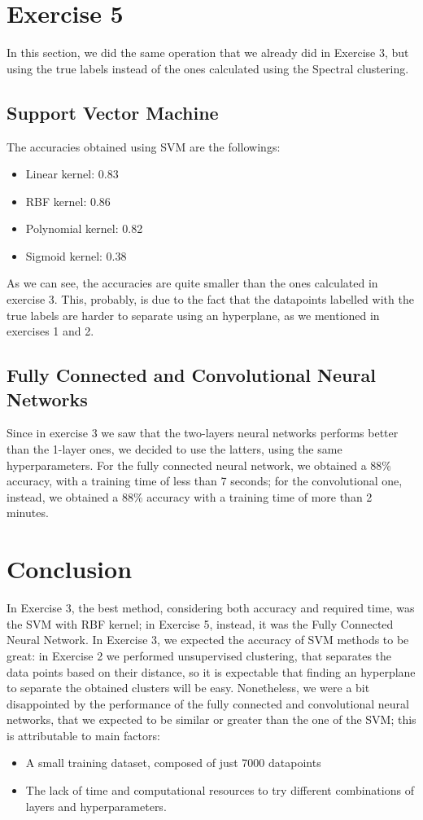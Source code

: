 \documentclass[12pt]{article}
\begin{document}
	\section*{Exercise 5}
	In this section, we did the same operation that we already did in Exercise 3, but using the true labels instead of the ones calculated using the Spectral clustering.\newline
	\subsection*{Support Vector Machine}
	The accuracies obtained using SVM are the followings:
	\begin{itemize}
		\item Linear kernel: 0.83
		\item RBF kernel: 0.86
		\item Polynomial kernel: 0.82
		\item Sigmoid kernel: 0.38
	\end{itemize}
	As we can see, the accuracies are quite smaller than the ones calculated in exercise 3. This, probably, is due to the fact that the datapoints labelled with the true labels are harder to separate using an hyperplane, as we mentioned in exercises 1 and 2.
	
	\subsection*{Fully Connected and Convolutional Neural Networks}
	Since in exercise 3 we saw that the two-layers neural networks performs better than the 1-layer ones, we decided to use the latters, using the same hyperparameters.
	For the fully connected neural network, we obtained a 88\% accuracy, with a training time of less than 7 seconds; for the convolutional one, instead, we obtained a 88\% accuracy with a training time of more than 2 minutes.
	
	
	\section*{Conclusion}
	In Exercise 3, the best method, considering both accuracy and required time, was the SVM with RBF kernel; in Exercise 5, instead, it was the Fully Connected Neural Network.\newline
	In Exercise 3, we expected the accuracy of SVM methods to be great: in Exercise 2 we performed unsupervised clustering, that separates the data points based on their distance, so it is expectable that finding an hyperplane to separate the obtained clusters will be easy.\newline
	Nonetheless, we were a bit disappointed by the performance of the fully connected and convolutional neural networks, that we expected to be similar or greater than the one of the SVM; this is attributable to main factors:
	\begin{itemize}
		\item A small training dataset, composed of just 7000 datapoints
		\item The lack of time and computational resources to try different combinations of layers and hyperparameters.
	\end{itemize}
	
\end{document}
